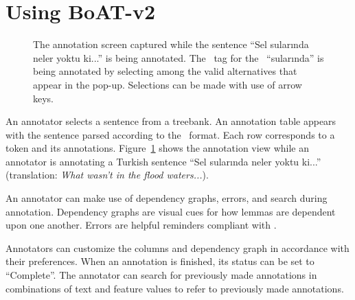 \section{Using BoAT-v2}
\label{sec:annotation}


\begin{figure}[th!]
    \centering
    \caption{The annotation screen captured while the sentence ``Sel sularında neler yoktu ki...'' is being annotated. The \deprel\ tag for the \form\ ``sularında'' is being annotated by selecting among the valid alternatives that appear in the pop-up. Selections can be made with use of arrow keys.}
    \label{fig:anno-fig}
\end{figure}


An annotator selects a sentence from a treebank.
An annotation table appears with the sentence parsed according to the \ud\ format.
Each row corresponds to a token and its annotations.
Figure~\ref{fig:anno-fig} shows the annotation view while an annotator is annotating a Turkish sentence ``Sel sularında neler yoktu ki...'' (translation: \textit{What wasn't in the flood waters...}).

An annotator can make use of dependency graphs, errors, and search during annotation.
Dependency graphs are visual cues for how lemmas are dependent upon one another.
Errors are helpful reminders compliant with \ud.

Annotators can customize the columns and dependency graph in accordance with their preferences.
When an annotation is finished, its status can be set to ``Complete''.
The annotator can search for previously made annotations in combinations of text and feature values to refer to previously made annotations.
